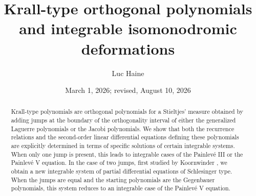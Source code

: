 \documentclass[10pt, reqno]{amsart}
\numberwithin{equation}{section}
\numberwithin{equation}{section}
\begin{document}
\title[Krall-type polynomials and isomonodromic deformations]{Krall-type orthogonal polynomials and integrable isomonodromic deformations}

\author[L.~Haine]{Luc Haine}
\address{UCLouvain, Institut de Recherche en Mathématique et Physique, IRMP,
Chemin du Cyclotron 2, 1348 Louvain-la-Neuve, Belgium}

\date{March 1, 2026; revised, August 10, 2026}


\begin{abstract} 
Krall-type polynomials are orthogonal polynomials for a Stieltjes' measure obtained by adding jumps at the boundary of the orthogonality interval of either the generalized Laguerre polynomials or the Jacobi polynomials. We show that both the recurrence relations and the second-order linear differential equations defining these polynomials are explicitly determined in terms of specific solutions of certain integrable systems. When only one jump is present, this leads to integrable cases of the Painlevé III or the Painlevé V equation. In the case of two jumps, first studied by Koornwinder \cite{Ko}, we obtain a new integrable system of partial differential equations of Schlesinger type. When the jumps are equal and the starting polynomials are the Gegenbauer polynomials, this system reduces to an integrable case of the Painlevé V equation.
\end{abstract}
\maketitle
\end{document}
